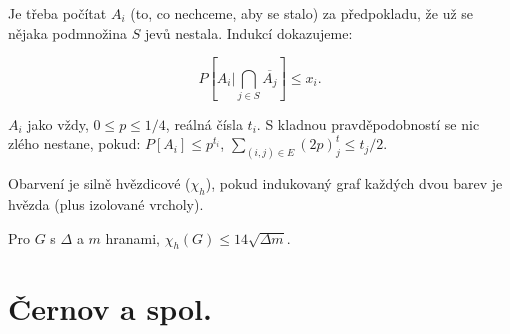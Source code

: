 \prf{} Je třeba počítat $A_i$ (to, co nechceme, aby se stalo) za předpokladu, že
už se nějaka podmnožina $S$ jevů nestala. Indukcí dokazujeme:

$$ P[A_i|\bigcap_{j \in S} \overline{A_j}] \le x_i.$$


 $A_i$ jako vždy, $0 \le p \le 1/4$, reálná čísla $t_i$.
S kladnou pravděpodobností se nic zlého nestane, pokud:
\itemize\ibull
\: $P[A_i] \le p^{t_i}$,
\: $\sum_{(i,j) \in E} (2p)^t_j \le t_j /2$.
\endlist

\dfn{}Obarvení je {\I silně hvězdicové} ($\chi_h$), pokud indukovaný graf každých dvou barev
je hvězda (plus izolované vrcholy).

\thm{} Pro $G$ s $\Delta$ a $m$ hranami, $\chi_h(G) \le 14 \sqrt{\Delta m}$.

\prf{} 

\section{Černov a spol.}

\bye
